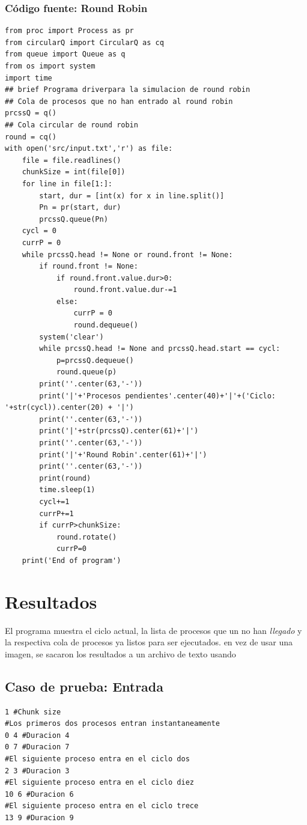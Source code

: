\documentclass[12pt]{article}
\begin{document}
\subsubsection{Código fuente: Round Robin}
\begin{verbatim}
from proc import Process as pr
from circularQ import CircularQ as cq
from queue import Queue as q
from os import system
import time
## brief Programa driverpara la simulacion de round robin
## Cola de procesos que no han entrado al round robin
prcssQ = q()
## Cola circular de round robin
round = cq()
with open('src/input.txt','r') as file:
    file = file.readlines()
    chunkSize = int(file[0])
    for line in file[1:]:
        start, dur = [int(x) for x in line.split()]
        Pn = pr(start, dur)
        prcssQ.queue(Pn)
    cycl = 0
    currP = 0
    while prcssQ.head != None or round.front != None:
        if round.front != None:
            if round.front.value.dur>0:
                round.front.value.dur-=1
            else:
                currP = 0
                round.dequeue()
        system('clear')
        while prcssQ.head != None and prcssQ.head.start == cycl:
            p=prcssQ.dequeue()
            round.queue(p)
        print(''.center(63,'-'))
        print('|'+'Procesos pendientes'.center(40)+'|'+('Ciclo: '+str(cycl)).center(20) + '|')
        print(''.center(63,'-'))
        print('|'+str(prcssQ).center(61)+'|')
        print(''.center(63,'-'))
        print('|'+'Round Robin'.center(61)+'|')
        print(''.center(63,'-'))
        print(round)
        time.sleep(1)
        cycl+=1
        currP+=1
        if currP>chunkSize:
            round.rotate()
            currP=0
    print('End of program')
\end{verbatim}
\section{Resultados}
El programa muestra el ciclo actual, la lista de procesos que un no han \emph{llegado} y la respectiva cola de procesos ya listos para ser ejecutados. en vez de usar una imagen, se sacaron los resultados a un archivo de texto usando 
\subsection{Caso de prueba: Entrada}
\begin{verbatim}
1 #Chunk size
#Los primeros dos procesos entran instantaneamente
0 4 #Duracion 4
0 7 #Duracion 7
#El siguiente proceso entra en el ciclo dos 
2 3 #Duracion 3
#El siguiente proceso entra en el ciclo diez
10 6 #Duracion 6
#El siguiente proceso entra en el ciclo trece
13 9 #Duracion 9
\end{verbatim}
\end{document}
